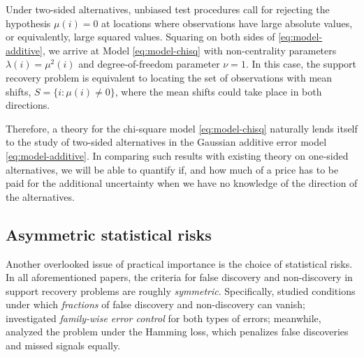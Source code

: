 Under two-sided alternatives, unbiased test procedures call for rejecting the hypothesis $\mu(i)=0$ at locations where observations have large absolute values, or equivalently, large squared values.
Squaring on both sides of \eqref{eq:model-additive}, we arrive at Model \eqref{eq:model-chisq} with non-centrality parameters $\lambda(i) = \mu^2(i)$ and degree-of-freedom parameter $\nu =1$.
In this case, the support recovery problem is equivalent to locating the set of observations with mean shifts, $S=\{i:\mu(i)\neq 0\}$, where the mean shifts could take place in both directions.

Therefore, a theory for the chi-square model \eqref{eq:model-chisq} naturally lends itself to the study of two-sided alternatives in the Gaussian additive error model \eqref{eq:model-additive}.
In comparing such results with existing theory on one-sided alternatives, we will be able to quantify if, and how much of a price has to be paid for the additional uncertainty when we have no knowledge of the direction of the alternatives.


\subsection{Asymmetric statistical risks}
\label{subsec:asymmetric-risk}

Another overlooked issue of practical importance is the choice of statistical risks.
In all aforementioned papers, the criteria for false discovery and non-discovery in support recovery problems are roughly \emph{symmetric}.
Specifically, \citet{arias2017distribution} studied conditions under which \emph{fractions} of false discovery and non-discovery can vanish; \citet{gao2018fundamental} investigated \emph{family-wise error control} for both types of errors; meanwhile, \citet{butucea2018variable} analyzed the problem under the Hamming loss, which penalizes false discoveries and missed signals {equally}.

